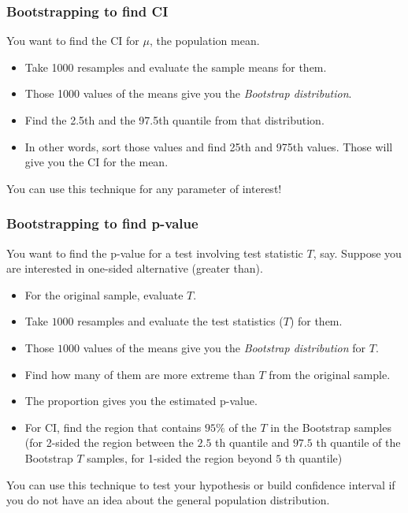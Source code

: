 \documentclass{beamer}\usepackage[]{graphicx}\usepackage[]{color}
\begin{document}
\begin{frame}

\frametitle{Bootstrapping to find CI}

You want to find the CI for $\mu$, the population mean. \pause
\begin{itemize}
\item Take 1000 resamples and evaluate the sample means for them. \pause
\item Those 1000 values of the means give you the {\it Bootstrap distribution}. \pause
\item Find the 2.5th and the 97.5th quantile from that distribution. \pause
\item In other words, sort those values and find 25th and 975th values. Those will give you the CI for the mean. \pause
\end{itemize}

You can use this technique for any parameter of interest!

\end{frame}


\begin{frame}[fragile]

\frametitle{Bootstrapping to find p-value}

You want to find the p-value for a test involving test statistic $T$, say. Suppose you are interested in one-sided alternative (greater than). \pause
\begin{itemize}
\item For the original sample, evaluate $T$. \pause
\item Take $1000$ resamples and evaluate the test statistics ($T$) for them. \pause
\item Those $1000$ values of the means give you the {\it Bootstrap distribution} for $T$. \pause
\item Find how many of them are more extreme than $T$ from the original sample. \pause
\item The proportion gives you the estimated p-value. \pause
\item For CI, find the region that contains $95 \%$ of the $T$ in the Bootstrap samples (for 2-sided the region between the $2.5$ th quantile and $97.5$ th quantile of the Bootstrap $T$ samples, for 1-sided the region beyond $5$ th quantile)
\end{itemize}

You can use this technique to test your hypothesis or build confidence interval if you do not have an idea about the general population distribution.

\end{frame}
\end{document}
